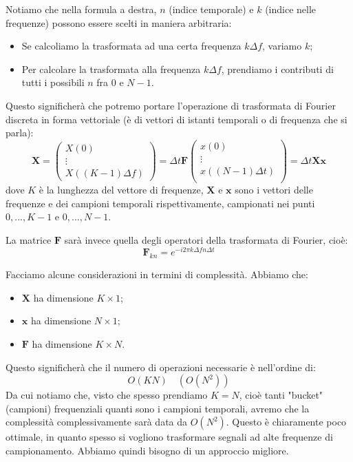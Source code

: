 \documentclass[a4paper,11pt]{article}
\begin{document}
Notiamo che nella formula a destra, $n$ (indice temporale) e $k$ (indice nelle frequenze) possono essere scelti in maniera arbitraria:
\begin{itemize}
	\item Se calcoliamo la trasformata ad una certa frequenza $k \Delta f$, variamo $k$;
	\item Per calcolare la trasformata alla frequenza $k \Delta f$, prendiamo i contributi di tutti i possibili $n$ fra $0$ e $N - 1$.
\end{itemize}
Questo significherà che potremo portare l'operazione di trasformata di Fourier discreta in forma vettoriale (è di vettori di istanti temporali o di frequenza che si parla):
$$
\mathbf{X} =
\begin{pmatrix}
X\left( 0 \right) \\
\vdots \\
X\left( (K - 1) \Delta f \right)
\end{pmatrix} =
\Delta t \mathbf{F}
\begin{pmatrix}
x \left( 0 \right) \\
\vdots \\
x \left( (N - 1) \Delta t \right) \\
\end{pmatrix} =
\Delta t \mathbf{X} \mathbf{x}
$$
dove $K$ è la lunghezza del vettore di frequenze, $\mathbf{X}$ e $\mathbf{x}$ sono i vettori delle frequenze e dei campioni temporali rispettivamente, campionati nei punti $0, ..., K - 1$ e $0, ..., N - 1$.

La matrice $\mathbf{F}$ sarà invece quella degli operatori della trasformata di Fourier, cioè:
$$
\mathbf{F}_{kn} = e^{- i 2 \pi k \Delta f n \Delta t}
$$

Facciamo alcune considerazioni in termini di complessità. Abbiamo che:
\begin{itemize}
	\item $\mathbf{X}$ ha dimensione $K \times 1$;
	\item $\mathbf{x}$ ha dimensione $N \times 1$;
	\item $\mathbf{F}$ ha dimensione $K \times N$.
\end{itemize}
Questo significherà che il numero di operazioni necessarie è nell'ordine di:
$$
O(KN) \quad \left( O(N^2) \right)
$$
Da cui notiamo che, visto che spesso prendiamo $K = N$, cioè tanti "bucket" (campioni) frequenziali quanti sono i campioni temporali, avremo che la complessità complessivamente sarà data da $O(N^2)$. Questo è chiaramente poco ottimale, in quanto spesso si vogliono trasformare segnali ad alte frequenze di campionamento. Abbiamo quindi bisogno di un approccio migliore.
\end{document}
